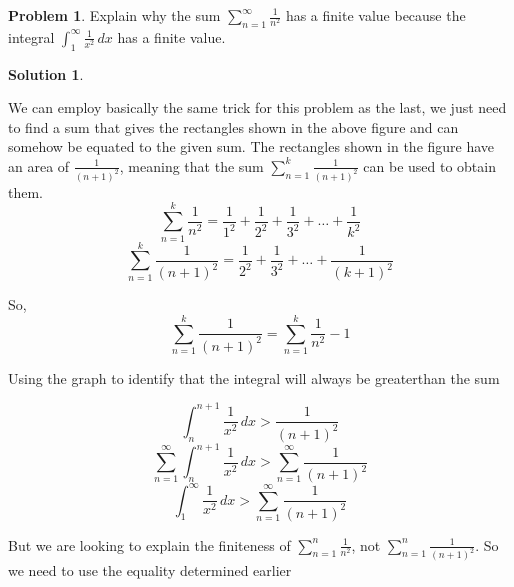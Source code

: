 \documentclass[10pt]{article}
\theoremstyle{definition}
\newtheorem{problem}{Problem}
\newtheorem{soln}{Solution}
\begin{document}
\begin{problem}
Explain why the sum $\sum_{n = 1}^{\infty} \frac{1}{n^2}$ has a finite value because the integral $\int_{1}^{\infty} \frac{1}{x^2} \,dx $ has a finite value.
\end{problem}
\begin{soln} ~\\
    \begin{center}
    \end{center}
    \noindent We can employ basically the same trick for this problem as the last, we just need to find a sum that gives the rectangles shown in the above figure and can somehow be equated to the given sum.
    The rectangles shown in the figure have an area of $\frac{1}{(n+1)^2}$, meaning that the sum $\sum_{n = 1}^{k} \frac{1}{(n+1)^2}$ can be used to obtain them.
    $$\sum_{n = 1}^{k} \frac{1}{n^2} = \frac{1}{1^2}+\frac{1}{2^2}+\frac{1}{3^2}+\dots+\frac{1}{k^2}$$
    $$\sum_{n = 1}^{k} \frac{1}{(n+1)^2} = \frac{1}{2^2}+\frac{1}{3^2}+\dots+\frac{1}{(k+1)^2}$$

    \noindent So,
    $$\sum_{n = 1}^{k} \frac{1}{(n+1)^2} = \sum_{n = 1}^{k} \frac{1}{n^2}-1$$

    \noindent Using the graph to identify that the integral will always be greater\footnotemark[1] than the sum

    $$\int_{n}^{n+1} \frac{1}{x^2} \,dx > \frac{1}{(n+1)^2}  $$
    $$\sum_{n = 1}^{\infty}\int_{n}^{n+1} \frac{1}{x^2} \,dx > \sum_{n = 1}^{\infty} \frac{1}{(n+1)^2} $$
    $$\int_{1}^{\infty} \frac{1}{x^2} \,dx > \sum_{n = 1}^{\infty} \frac{1}{(n+1)^2} $$

    \noindent But we are looking to explain the finiteness of $\sum_{n = 1}^{n} \frac{1}{n^2}$, not $\sum_{n = 1}^{n} \frac{1}{(n+1)^2}$. So we need to use the equality determined earlier


\end{soln}
\end{document}
